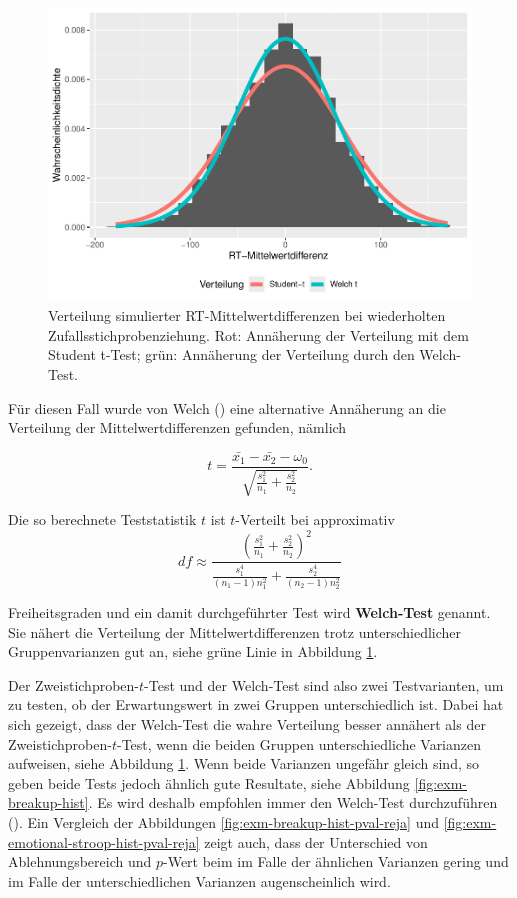 \documentclass[
]{book}
\theoremstyle{definition}
\theoremstyle{definition}
\theoremstyle{definition}
\theoremstyle{definition}
\theoremstyle{remark}
\begin{document}
\begin{figure}
\centering
\includegraphics{aps_statistik1_files/figure-latex/exm-emotional-stroop-hist-1.pdf}
\caption{\label{fig:exm-emotional-stroop-hist}Verteilung simulierter RT-Mittelwertdifferenzen bei wiederholten Zufallsstichprobenziehung. Rot: Annäherung der Verteilung mit dem Student t-Test; grün: Annäherung der Verteilung durch den Welch-Test.}
\end{figure}

Für diesen Fall wurde von Welch () eine alternative Annäherung an die Verteilung der Mittelwertdifferenzen gefunden, nämlich

\begin{equation}
t = \frac{\bar{x_1}-\bar{x_2} - \omega_0}{\sqrt{\frac{s_1^2}{n_1}+\frac{s_2^2}{n_2}}}.
\label{eq:t-emp-twosample-welch}
\end{equation}

Die so berechnete Teststatistik \(t\) ist \(t\)-Verteilt bei approximativ
\[df \approx\frac{\left(\frac{s_1^2}{n_1}+\frac{s_2^2}{n_2}\right)^2}{\frac{s_1^4}{(n_1-1) n_1^2}+ \frac{s_2^4}{(n_2-1) n_2^2}}  \]

\label{customdef-welch-test}{Freiheitsgraden und ein damit durchgeführter Test wird \textbf{Welch-Test} genannt.} Sie nähert die Verteilung der Mittelwertdifferenzen trotz unterschiedlicher Gruppenvarianzen gut an, siehe grüne Linie in Abbildung \ref{fig:exm-emotional-stroop-hist}.

Der Zweistichproben-\(t\)-Test und der Welch-Test sind also zwei Testvarianten, um zu testen, ob der Erwartungswert in zwei Gruppen unterschiedlich ist. Dabei hat sich gezeigt, dass der Welch-Test die wahre Verteilung besser annähert als der Zweistichproben-\(t\)-Test, wenn die beiden Gruppen unterschiedliche Varianzen aufweisen, siehe Abbildung \ref{fig:exm-emotional-stroop-hist}. Wenn beide Varianzen ungefähr gleich sind, so geben beide Tests jedoch ähnlich gute Resultate, siehe Abbildung \ref{fig:exm-breakup-hist}. Es wird deshalb empfohlen immer den Welch-Test durchzuführen (). Ein Vergleich der Abbildungen \ref{fig:exm-breakup-hist-pval-reja} und \ref{fig:exm-emotional-stroop-hist-pval-reja} zeigt auch, dass der Unterschied von Ablehnungsbereich und \(p\)-Wert beim im Falle der ähnlichen Varianzen gering und im Falle der unterschiedlichen Varianzen augenscheinlich wird.
\end{document}
